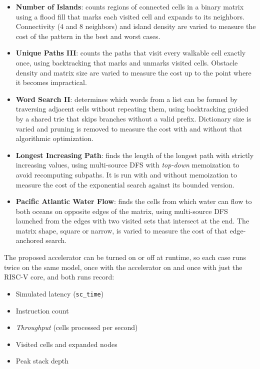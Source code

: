 \documentclass[conference]{IEEEtran}
\begin{document}
\begin{itemize}
\item \textbf{Number of Islands}: counts regions of connected cells in a binary
matrix using a flood fill that marks each visited cell and expands to its
neighbors. Connectivity (4 and 8 neighbors) and island density are varied to
measure the cost of the pattern in the best and worst cases.
\item \textbf{Unique Paths III}: counts the paths that visit every walkable cell
exactly once, using backtracking that marks and unmarks visited cells. Obstacle
density and matrix size are varied to measure the cost
up to the point where it becomes impractical.
\item \textbf{Word Search II}: determines which words from a list can be formed
by traversing adjacent cells without repeating them, using backtracking guided
by a shared trie that skips branches without a valid prefix. Dictionary size is
varied and pruning is removed to measure the cost with and without that
algorithmic optimization.
\item \textbf{Longest Increasing Path}: finds the length of the longest path
with strictly increasing values, using multi-source DFS with \textit{top-down}
memoization to avoid recomputing subpaths. It is run with and without
memoization to measure the cost of the exponential search against its bounded
version.
\item \textbf{Pacific Atlantic Water Flow}: finds the cells from which water can
flow to both oceans on opposite edges of the matrix, using multi-source DFS
launched from the edges with two visited sets that intersect at the end. The
matrix shape, square or narrow, is varied to measure the cost of that
edge-anchored search.
\end{itemize}

The proposed accelerator can be turned on or off at runtime, so each case runs
twice on the same model, once with the accelerator on and once with just the
RISC-V core, and both runs record:

\begin{itemize}
\item Simulated latency (\texttt{sc\_time})
\item Instruction count
\item \textit{Throughput} (cells processed per second)
\item Visited cells and expanded nodes
\item Peak stack depth
\end{itemize}
\end{document}
